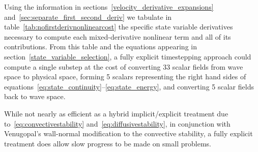 \documentclass[letterpaper,11pt,nointlimits,reqno,draft]{amsart}
\begin{document}
Using the information in sections~\ref{velocity_derivative_expansions}
and~\ref{sec:separate_first_second_deriv} we tabulate in
table~\vref{tab:nofirstderivnonlinearcost} the specific state variable
derivatives necessary to compute each mixed-derivative nonlinear term and all
of its contributions.  From this table and the equations appearing in
section~\ref{state_variable_selection}, a fully explicit timestepping approach
could compute a single substep at the cost of converting 33 scalar fields from
wave space to physical space, forming 5 scalars representing the right hand
sides of equations~\eqref{eq:state_continuity}--\eqref{eq:state_energy}, and
converting 5 scalar fields back to wave space.

While not nearly as efficient as a hybrid implicit/explicit treatment due
to~\eqref{eq:convectivestability} and~\eqref{eq:diffusivestability}, in
conjunction with Venugopal's wall-normal modification to the convective
stability, a fully explicit treatment does allow slow progress to be made on
small problems.
\end{document}
